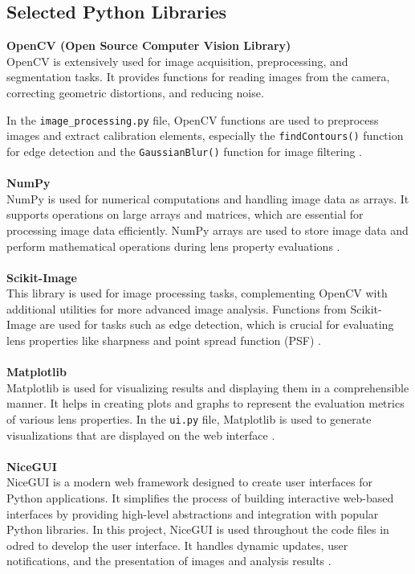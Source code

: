 \subsection{Selected Python Libraries}
\textbf{OpenCV (Open Source Computer Vision Library)}
\\
OpenCV is extensively used for image acquisition, preprocessing, and segmentation tasks. It provides functions for reading images from the camera, correcting geometric distortions, and reducing noise. 

In the \texttt{image\_processing.py} file, OpenCV functions are used to preprocess images and extract calibration elements, especially the \texttt{findContours()} function for edge detection and the \texttt{GaussianBlur()} function for image filtering \cite{opencv}.
\\
\\
\textbf{NumPy}
\\
NumPy is used for numerical computations and handling image data as arrays. It supports operations on large arrays and matrices, which are essential for processing image data efficiently. NumPy arrays are used to store image data and perform mathematical operations during lens property evaluations \cite{numpy}.
\\
\\
\textbf{Scikit-Image}
\\
This library is used for image processing tasks, complementing OpenCV with additional utilities for more advanced image analysis. Functions from Scikit-Image are used for tasks such as edge detection, which is crucial for evaluating lens properties like sharpness and point spread function (PSF) \cite{scikit}.
\\
\\
\textbf{Matplotlib}
\\
Matplotlib is used for visualizing results and displaying them in a comprehensible manner. It helps in creating plots and graphs to represent the evaluation metrics of various lens properties. In the \texttt{ui.py} file, Matplotlib is used to generate visualizations that are displayed on the web interface \cite{matplotlib}.
\\
\\
\textbf{NiceGUI}
\\
NiceGUI is a modern web framework designed to create user interfaces for Python applications. It simplifies the process of building interactive web-based interfaces by providing high-level abstractions and integration with popular Python libraries. In this project, NiceGUI is used throughout the code files in odred to develop the user interface. It handles dynamic updates, user notifications, and the presentation of images and analysis results \cite{nicegui}.

